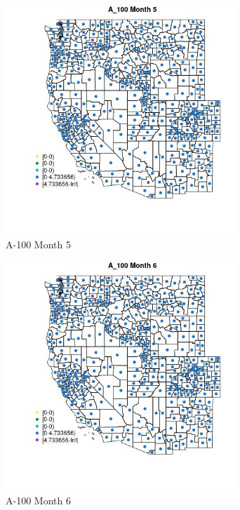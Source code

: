 \begin{figure} 
\centering  
\includegraphics[width=0.77\textwidth]{Code_Outputs/df_report_ML_predictors_CountyCentroid_Locations_Dates_2008-01-01to2018-12-31_MapObsMo5A_100.jpg} 
\caption{\label{fig:df_report_ML_predictors_CountyCentroid_Locations_Dates_2008-01-01to2018-12-31MapObsMo5A_100}A-100 Month 5} 
\end{figure} 
 

\begin{figure} 
\centering  
\includegraphics[width=0.77\textwidth]{Code_Outputs/df_report_ML_predictors_CountyCentroid_Locations_Dates_2008-01-01to2018-12-31_MapObsMo6A_100.jpg} 
\caption{\label{fig:df_report_ML_predictors_CountyCentroid_Locations_Dates_2008-01-01to2018-12-31MapObsMo6A_100}A-100 Month 6} 
\end{figure} 
 


